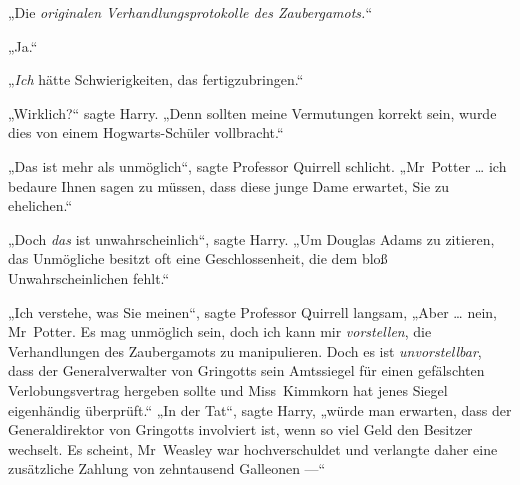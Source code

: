 „Die \emph{originalen Verhandlungsprotokolle des Zaubergamots.}“

„Ja.“

„\emph{Ich} hätte Schwierigkeiten, das fertigzubringen.“

„Wirklich?“ sagte Harry.
„Denn sollten meine Vermutungen korrekt sein, wurde dies von einem Hogwarts-Schüler vollbracht.“

„Das ist mehr als unmöglich“, sagte Professor Quirrell schlicht.
„Mr~Potter … ich bedaure Ihnen sagen zu müssen, dass diese junge Dame erwartet, Sie zu ehelichen.“

„Doch \emph{das} ist unwahrscheinlich“, sagte Harry.
„Um Douglas Adams zu zitieren, das Unmögliche besitzt oft eine Geschlossenheit, die dem bloß Unwahrscheinlichen fehlt.“

„Ich verstehe, was Sie meinen“, sagte Professor Quirrell langsam,
„Aber … nein, Mr~Potter. Es mag unmöglich sein, doch ich kann mir \emph{vorstellen}, die Verhandlungen des Zaubergamots zu manipulieren. Doch es ist \emph{unvorstellbar}, dass der Generalverwalter von Gringotts sein Amtssiegel für einen gefälschten Verlobungsvertrag hergeben sollte und Miss~Kimmkorn hat jenes Siegel eigenhändig überprüft.“
„In der Tat“, sagte Harry, „würde man erwarten, dass der Generaldirektor von Gringotts involviert ist, wenn so viel Geld den Besitzer wechselt. Es scheint, Mr~Weasley war hochverschuldet und verlangte daher eine zusätzliche Zahlung von zehntausend Galleonen —“

